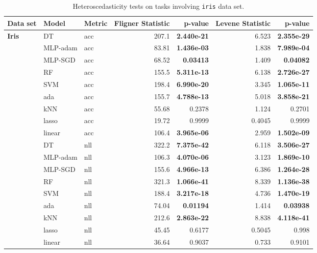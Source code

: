 \documentclass[jair,twoside,11pt,theapa]{article}
\theoremstyle{definition}
\begin{document}
\begin{table*}
\centering
\caption{Heteroscedasticity tests on tasks involving \texttt{iris} data set.}
\label{tab:search-spacehetero-tests-iris}
\begin{tabular}{lllrrrr}
\toprule
Data set & Model & Metric & Fligner Statistic & p-value & Levene Statistic & p-value \\ 
\midrule
\textbf{Iris} & DT & acc & 207.1 & \textbf{2.440e-21} & 6.523 & \textbf{2.355e-29} \\ 
  & MLP-adam & acc & 83.81 & \textbf{1.436e-03} & 1.838 & \textbf{7.989e-04} \\ 
  & MLP-SGD & acc & 68.52 & \textbf{0.03413} & 1.409 & \textbf{0.04082} \\ 
  & RF & acc & 155.5 & \textbf{5.311e-13} & 6.138 & \textbf{2.726e-27} \\ 
  & SVM & acc & 198.4 & \textbf{6.990e-20} & 3.345 & \textbf{1.065e-11} \\ 
  & ada & acc & 155.7 & \textbf{4.788e-13} & 5.018 & \textbf{3.858e-21} \\ 
  & kNN & acc & 55.68 & 0.2378 & 1.124 & 0.2701 \\ 
  & lasso & acc & 19.72 & 0.9999 & 0.4045 & 0.9999 \\ 
  & linear & acc & 106.4 & \textbf{3.965e-06} & 2.959 & \textbf{1.502e-09} \\ 
  & DT & nll & 322.2 & \textbf{7.375e-42} & 6.118 & \textbf{3.506e-27} \\ 
  & MLP-adam & nll & 106.3 & \textbf{4.070e-06} & 3.123 & \textbf{1.869e-10} \\ 
  & MLP-SGD & nll & 155.6 & \textbf{4.966e-13} & 6.386 & \textbf{1.264e-28} \\ 
  & RF & nll & 321.3 & \textbf{1.066e-41} & 8.339 & \textbf{1.136e-38} \\ 
  & SVM & nll & 188.4 & \textbf{3.217e-18} & 4.736 & \textbf{1.470e-19} \\ 
  & ada & nll & 74.04 & \textbf{0.01194} & 1.414 & \textbf{0.03938} \\ 
  & kNN & nll & 212.6 & \textbf{2.863e-22} & 8.838 & \textbf{4.118e-41} \\ 
  & lasso & nll & 45.45 & 0.6177 & 0.5045 & 0.998 \\ 
  & linear & nll & 36.64 & 0.9037 & 0.733 & 0.9101 \\ 
\bottomrule
\end{tabular}
\end{table*}
\end{document}
